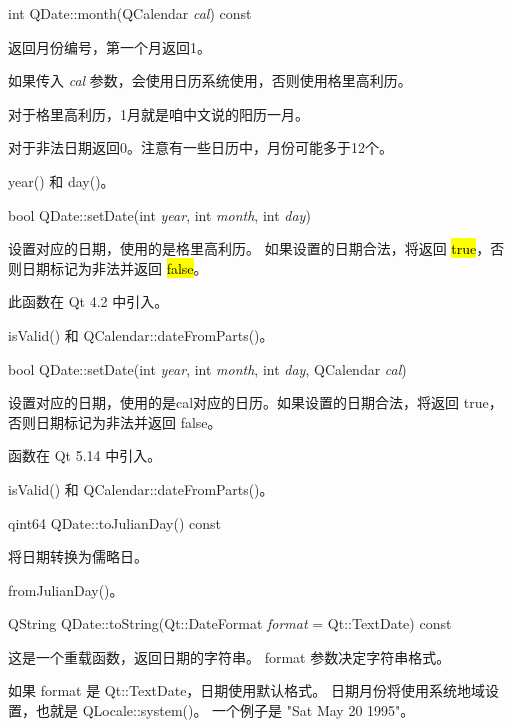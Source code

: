 int QDate::month(QCalendar \emph{cal}) const

返回月份编号，第一个月返回1。

如果传入 \emph{cal} 参数，会使用日历系统使用，否则使用格里高利历。

对于格里高利历，1月就是咱中文说的阳历一月。

对于非法日期返回0。注意有一些日历中，月份可能多于12个。



\begin{notice}[另请参阅]
 year() 和 day()。
\end{notice}

\splitLine

bool QDate::setDate(int \emph{year}, int  \emph{month}, int \emph{day})

设置对应的日期，使用的是格里高利历。 如果设置的日期合法，将返回
\hl{true}，否则日期标记为非法并返回 \hl{false}。

此函数在 Qt 4.2 中引入。


\begin{notice}[另请参阅]
isValid() 和 QCalendar::dateFromParts()。
\end{notice}

\splitLine

bool QDate::setDate(int \emph{year}, int \emph{month}, int \emph{day}, QCalendar \emph{cal})

设置对应的日期，使用的是cal对应的日历。如果设置的日期合法，将返回 true，否则日期标记为非法并返回 false。

函数在 Qt 5.14 中引入。

\begin{notice}[另请参阅]
isValid() 和 QCalendar::dateFromParts()。
\end{notice}

\splitLine

qint64 QDate::toJulianDay() const

将日期转换为儒略日。

\begin{notice}[另请参阅]
fromJulianDay()。
\end{notice}

\splitLine

QString QDate::toString(Qt::DateFormat \emph{format} = Qt::TextDate) const

这是一个重载函数，返回日期的字符串。 format 参数决定字符串格式。

如果 format 是 Qt::TextDate，日期使用默认格式。
日期月份将使用系统地域设置，也就是 QLocale::system()。
一个例子是 "Sat May 20 1995"。

